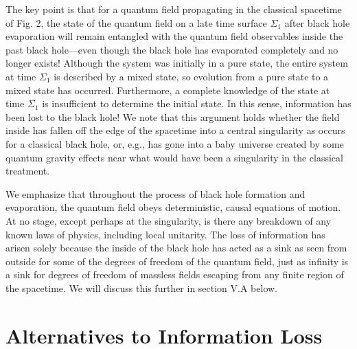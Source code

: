 \documentclass[12pt,nofootinbib,amsmath,amssymb,amsfonts,aps,prd,groupedaddress]{revtex4-1}
\begin{document}
The key point is that for a
quantum field propagating in the classical spacetime of Fig. 2, the state of the
quantum field on a late time surface $\Sigma_1$ after black hole evaporation
will remain entangled
with the quantum field observables inside the past black hole---even though the black
hole has evaporated completely and no longer exists!  Although the system was
initially in a pure state, the entire system at time $\Sigma_1$ is described by
a mixed state, so evolution from a pure state to a mixed state has occurred.
Furthermore, a complete knowledge of the state at time $\Sigma_1$ is
insufficient to determine the initial state. In this sense, information has been
lost to the black hole! We note that this argument holds whether the field inside has fallen off the edge of the
spacetime into a central singularity as occurs for a classical black hole, or, e.g., has gone into a baby universe created
by some quantum gravity effects near what would have been a singularity in the classical treatment. 

We emphasize that throughout the process of black hole formation and evaporation, the quantum field 
obeys deterministic, causal equations of motion. At no stage, except perhaps at the singularity, is there any breakdown 
of any known laws of physics, including local unitarity. The loss of information has arisen solely because the inside of the black hole
has acted as a sink as seen from outside for some of the degrees of freedom of the quantum field,
just as infinity is a sink for degrees of
freedom of massless fields escaping from any finite region of the spacetime. We will discuss this further in section V.A below.



\section{Alternatives to Information Loss} \label{alt}
\end{document}
